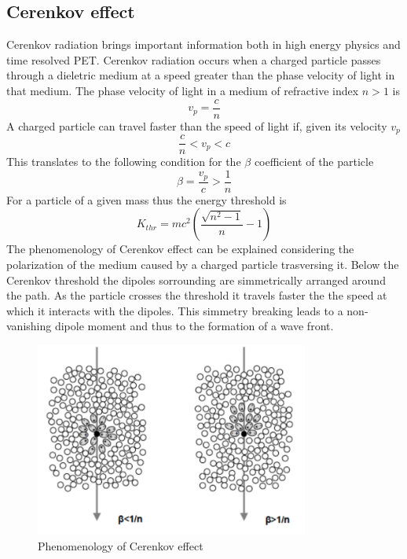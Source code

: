 \subsection{Cerenkov effect}
Cerenkov radiation brings important information both in high energy physics and time resolved PET.
Cerenkov radiation occurs when a charged particle passes through a dieletric medium at a speed greater than the phase velocity of light in that medium.
The phase velocity of light in a medium of refractive index $n > 1$ is
\begin{equation}
v_{p} = \frac{c}{n}
\end{equation}
A charged particle can travel faster than the speed of light if, given its velocity $v_{p}$ 
\begin{equation}
\frac{c}{n} < v_{p} < c
\end{equation}
This translates to the following condition for the $\beta$ coefficient of the particle
\begin{equation}
\beta = \frac{v_{p}}{c} > \frac{1}{n}
\end{equation}
For a particle of a given mass thus the energy threshold is
\begin{equation}
K_{thr} = mc^{2}\left( \frac{\sqrt {n^{2}-1}}{n} - 1 \right)
\label{eq:thr}
\end{equation}
The phenomenology of Cerenkov effect can be explained considering the polarization of the medium caused by a charged particle trasversing it.
Below the Cerenkov threshold the dipoles sorrounding are simmetrically arranged around the path. As the particle crosses the threshold it travels faster the the speed at which it interacts with the dipoles. This simmetry breaking leads to a non-vanishing dipole moment and thus to the formation of a wave front.

\begin{figure}
\centering
\includegraphics[width=9cm]{../Pictures/Chapter_2/cerenkov.pdf}
\caption[Cerenkov effect]{Phenomenology of Cerenkov effect}
\label{fig:cerenkov}
\end{figure}

